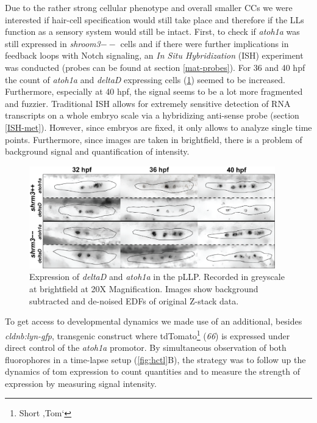 \documentclass[11pt,singlespacinge,twoside]{reedthesis} %
\begin{document}
Due to the rather strong cellular phenotype and overall smaller CCs we were interested if hair-cell specification would still take place and therefore if the LLs function as a sensory system would still be intact. First, to check if \emph{atoh1a} was still expressed in \emph{shroom3}\(--\) cells and if there were further implications in feedback loops with Notch signaling, an \emph{In Situ Hybridization} (ISH) experiment was conducted (probes can be found at section \ref{mat-probes}). For 36 and 40 hpf the count of \emph{atoh1a} and \emph{deltaD} expressing cells (\ref{fig:hcish}) seemed to be increased. Furthermore, especially at 40 hpf, the signal seems to be a lot more fragmented and fuzzier.
Traditional ISH allows for extremely sensitive detection of RNA transcripts on a whole embryo scale via a hybridizing anti-sense probe (section \ref{ISH-met}). However, since embryos are fixed, it only allows to analyze single time points. Furthermore, since images are taken in brightfield, there is a problem of background signal and quantification of intensity.


\begin{figure}

{\centering \includegraphics[width=0.95\textwidth]{figures/results/05_atoh/hc_ish} 

}

\caption[Expression of deltaD and atoh1a in the pLLP]{Expression of \emph{deltaD} and \emph{atoh1a} in the pLLP. Recorded in greyscale at brightfield at 20X Magnification. Images show background subtracted and de-noised EDFs of original Z-stack data.}\label{fig:hcish}
\end{figure}
To get access to developmental dynamics we made use of an additional, besides \emph{cldnb:lyn-gfp}, transgenic construct where tdTomato\footnote{Short ‚Tom`} (\emph{66}) is expressed under direct control of the \emph{atoh1a} promotor. By simultaneous observation of both fluorophores in a time-lapse setup (\ref{fig:hctl}B), the strategy was to follow up the dynamics of tom expression to count quantities and to measure the strength of expression by measuring signal intensity.
\end{document}
